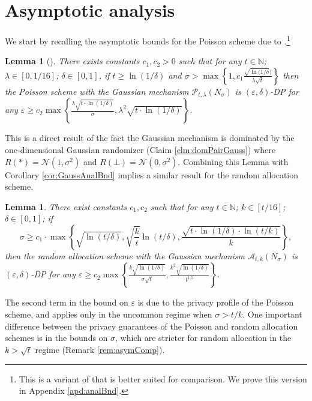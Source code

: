 \documentclass{article}
\theoremstyle{plain}
\newtheorem{lemma}[theorem]{Lemma}
\theoremstyle{definition}
\newcommand{\eps}{\varepsilon}
\newcommand{\naturals}{\mathbb{N}}
\newcommand{\rand}{R}
\newcommand{\Pois}[2]{\mathcal{P}_{#1}\left(#2\right)}
\newcommand{\alloc}[2]{\mathcal{A}_{#1}\left(#2\right)}
\begin{document}
\section{Asymptotic analysis}\label{apd:asym}
We start by recalling the asymptotic bounds for the Poisson scheme due to \citet{ACGMMT16}.\footnote{This is a variant of \citet[Theorem 1]{ACGMMT16} that is better suited for comparison. We prove this version in Appendix \ref{apd:analBnd}.} 
\begin{lemma}[\citep{ACGMMT16}] \label{lem:poisPriv}
    There exists constants $c_{1}, c_{2} > 0$ such that for any $t \in \naturals$; $\lambda \in [0, 1/16]$; $\delta \in [0,1]$, if $t \ge \ln(1/\delta)$ and $\sigma > \max\left\{1, c_{1} \frac{\sqrt{\ln(1/\delta})}{\lambda \sqrt{t}} \right\}$ then the Poisson scheme with the Gaussian mechanism  $\Pois{t, \lambda}{N_{\sigma}}$ is $(\eps, \delta)$-DP for any $\eps \ge c_{2} \max\left\{\frac{\lambda \sqrt{t \cdot \ln(1/\delta)}}{\sigma}, \lambda^{2} \sqrt{t \cdot \ln(1/\delta)} \right\}$.
\end{lemma}

This is a direct result of the fact the Gaussian mechanism is dominated by the one-dimensional Gaussian randomizer (Claim \ref{clm:domPairGauss}) where $\rand(*) = \mathcal{N}(1, \sigma^{2})$ and $\rand(\bot) = \mathcal{N}(0, \sigma^{2})$. Combining this Lemma with Corollary \ref{cor:GaussAnalBnd} implies a similar result for the random allocation scheme.
\begin{lemma}\label{lem:GaussAsymBnd}
	There exist constants $c_{1}, c_{2}$ such that for any $t \in \naturals$; $k \in [t/16]$; $\delta \in [0, 1]$; if    
    \[
        \sigma \ge c_{1} \cdot \max \left\{\sqrt{\ln(t/\delta)}, \sqrt{\frac{k}{t}} \ln(t/\delta), \frac{\sqrt{t \cdot \ln(1/\delta) \cdot \ln(t/k)}}{k} \right\},
    \]
    then the random allocation scheme with the Gaussian mechanism  $\alloc{t, k}{N_{\sigma}}$ is $(\eps, \delta)$-DP for any $\eps \ge c_{2} \max\left\{\frac{k \sqrt{\ln(1/\delta)}}{\sigma \sqrt{t}}, \frac{k^{2} \sqrt{\ln(1/\delta)}}{t^{1.5}}\right\}$.
\end{lemma}

The second term in the bound on $\eps$ is due to the privacy profile of the Poisson scheme, and applies only in the uncommon regime when $\sigma > t/k$. One important difference between the privacy guarantees of the Poisson and random allocation schemes is in the bounds on $\sigma$, which are stricter for random allocation in the $k > \sqrt{t}$ regime (Remark \ref{rem:asymComp}).
\end{document}
